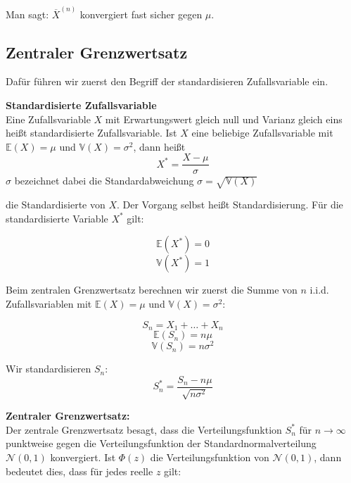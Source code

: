 {\begin{definition}
    Man sagt: ${\overline{X}}^{\left(n\right)}$ konvergiert fast sicher gegen $\mu$.
    \end{definition}

    \subsection{Zentraler Grenzwertsatz}

    Dafür führen wir zuerst den Begriff der standardisieren Zufallsvariable ein.

    \begin{definition}\textbf{Standardisierte Zufallsvariable}\\
    Eine Zufallsvariable $X$ mit Erwartungswert gleich null und Varianz gleich
    eins heißt standardisierte Zufallsvariable. Ist $X$ eine beliebige
    Zufallsvariable mit $\mathbb E\left(X\right)=\mu$ und $\mathbb V\left(X\right)=\sigma^{2}$,
    dann heißt 
    \[X^*=\frac{X-\mu }{\sigma }\]
    $\sigma$ bezeichnet dabei die Standardabweichung $\sigma=\sqrt{\mathbb V\left(X\right)}$

    die Standardisierte von $X$. Der Vorgang selbst heißt Standardisierung. Für die standardisierte Variable $X^*$ gilt:

    \[\mathbb E\left(X^*\right)=0\]
    \[\mathbb V\left(X^*\right)=1\]
    \end{definition}

    Beim zentralen Grenzwertsatz berechnen wir zuerst die Summe von $n$ i.i.d. Zufallsvariablen mit 
    $\mathbb E\left(X\right)=\mu $ und $\mathbb V\left(X\right)=\sigma^{2}$:

    \[S_{n}=X_{1}+\ldots +X_{n}\]
    \[\mathbb E\left(S_{n}\right)=n\mu\]
    \[\mathbb V\left(S_{n}\right)=n\sigma^{2}\]

    Wir standardisieren $S_{n}$:
    \[S_{n}^*=\frac{S_{n}-n\mu}{\sqrt{n\sigma^{2}}}\]

    \begin{satz}\textbf{Zentraler Grenzwertsatz:}\label{satz:zentraler_grenzwertsatz}\\
    Der zentrale Grenzwertsatz besagt, dass die Verteilungsfunktion 
    $S_{n}^*$ für $n\rightarrow\infty$
    punktweise gegen die Verteilungsfunktion der Standardnormalverteilung $\mathcal N\left(0,1\right)$ konvergiert. 
    Ist $\Phi\left(z\right)$ die Verteilungsfunktion von $\mathcal N\left(0,1\right)$, 
    dann bedeutet dies, dass für jedes reelle $z$ gilt:


\end{satz}}
